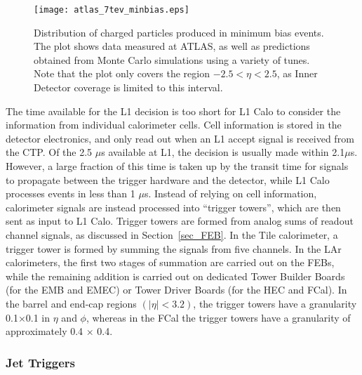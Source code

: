\begin{figure}[tb]
\begin{center}
\texttt{[image: atlas\_7tev\_minbias.eps]}
\end{center}
\caption[Distribution of charged particles in minimum-bias events.]{Distribution of charged particles produced in minimum bias events\cite{atlas_minbias}. The plot shows data measured at ATLAS, as well as predictions obtained from Monte Carlo simulations using a variety of tunes. Note that the plot only covers the region $-2.5 < \eta < 2.5$, as Inner Detector coverage is limited to this interval.}
\label{minbiasplot}
\end{figure}

The time available for the L1 decision is too short for L1 Calo to consider the information from individual calorimeter cells. Cell information is stored in the detector electronics, and only read out when an L1 accept signal is received from the CTP. Of the 2.5 $\mu$s available at L1, the decision is usually made within 2.1$\mu$s. However, a large fraction of this time is taken up by the transit time for signals to propagate between the trigger hardware and the detector, while L1 Calo processes events in less than 1 $\mu$s. Instead of relying on cell information, calorimeter signals are instead processed into ``trigger towers'', which are then sent as input to L1 Calo. Trigger towers are formed from analog sums of readout channel signals, as discussed in Section~\ref{sec_FEB}. In the Tile calorimeter, a trigger tower is formed by summing the signals from five channels. In the LAr calorimeters, the first two stages of summation are carried out on the FEBs, while the remaining addition is carried out on dedicated Tower Builder Boards (for the EMB and EMEC) or Tower Driver Boards (for the HEC and FCal)\cite{ATLAS_front_end_electronics}. In the barrel and end-cap regions $(|\eta| < 3.2)$, the trigger towers have a granularity 0.1$\times$0.1 in $\eta$ and $\phi$, whereas in the FCal the trigger towers have a granularity of approximately 0.4 $\times$ 0.4.

\subsubsection{Jet Triggers}

